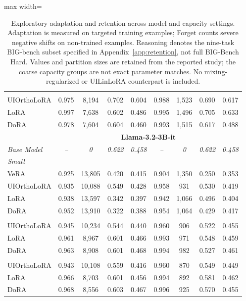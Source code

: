 \begin{table}[t]
\begin{adjustbox}{max width=\linewidth}
\begin{tabular}{l | c ccc | c ccc}
\addlinespace
\multicolumn{9}{l}{\textit{Large}} \\
UIOrthoLoRA & 0.975 & 8,194 & 0.702 & 0.604 & 0.988 & 1,523 & 0.690 & 0.617 \\
LoRA         & 0.997 & 7,638 & 0.602 & 0.486 & 0.995 & 1,496 & 0.705 & 0.633 \\
DoRA         & 0.978 & 7,604 & 0.604 & 0.460 & 0.993 & 1,515 & 0.617 & 0.488 \\
\midrule
\multicolumn{1}{c}{} & \multicolumn{8}{c}{\textbf{Llama-3.2-3B-it}} \\
\midrule
\addlinespace[0.3ex]
\rowcolor{gray!10} \textit{Base Model} & \textit{--} & \textit{0} & \textit{0.622} & \textit{0.458} & \textit{--} & \textit{0} & \textit{0.622} & \textit{0.458} \\
\midrule
\multicolumn{9}{l}{\textit{Small}} \\
VeRA         & 0.925 & 13,805 & 0.420 & 0.415 & 0.904 & 1,350 & 0.250 & 0.353 \\
UIOrthoLoRA & 0.935 & 10,088 & 0.549 & 0.428 & 0.958 & 931 & 0.530 & 0.419 \\
LoRA         & 0.938    & 13,597    & 0.342    & 0.397    & 0.942 & 1,066 & 0.496 & 0.404 \\
DoRA         & 0.952 & 13,910 & 0.322 & 0.388 & 0.954 & 1,064 & 0.429 & 0.417 \\
\addlinespace
\multicolumn{9}{l}{\textit{Medium}} \\
UIOrthoLoRA & 0.945 & 10,234 & 0.544 & 0.440 & 0.960 & 906 & 0.522 & 0.455 \\
LoRA         & 0.961 & 8,967 & 0.601 & 0.466 & 0.993 & 971 & 0.548 & 0.459 \\
DoRA         & 0.963 & 8,908 & 0.601 & 0.468 & 0.994 & 982 & 0.527 & 0.461 \\
\addlinespace
\multicolumn{9}{l}{\textit{Large}} \\
UIOrthoLoRA & 0.943 & 10,108 & 0.559 & 0.416 & 0.960 & 870 & 0.549 & 0.449 \\
LoRA         & 0.966 & 8,703 & 0.601 & 0.456 & 0.994 & 892 & 0.581 & 0.462 \\
DoRA         & 0.968 & 8,556 & 0.603 & 0.467 & 0.996 & 925 & 0.570 & 0.455 \\
\bottomrule
\end{tabular}
\end{adjustbox}
\caption{Exploratory adaptation and retention across model and capacity settings. Adaptation is measured on targeted training examples; Forget counts severe negative shifts on non-trained examples. Reasoning denotes the nine-task BIG-bench subset specified in Appendix~\ref{app:retention}, not full BIG-Bench Hard. Values and partition sizes are retained from the reported study; the coarse capacity groups are not exact parameter matches. No mixing-regularized or UILinLoRA counterpart is included.}
\label{tab:combined_model_performance}
\end{table}

